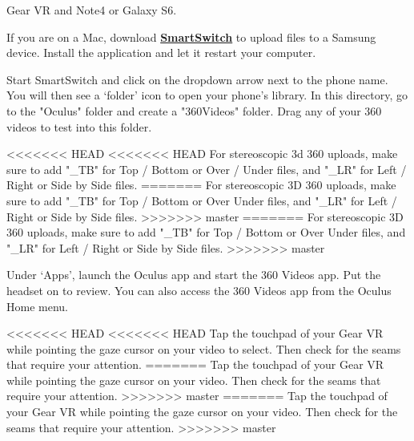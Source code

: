 \begin{fullwidth}
{\large Gear VR and Note4 or Galaxy S6. \par}

If you are on a Mac, download \textbf{\href{https://www.dropbox.com/sh/8kqte3wtyt3vltu/AAAjUnNxtXhaxprWF8_q9zbCa?dl=0}{SmartSwitch}} to upload files to a Samsung device. Install the application and let it restart your computer.

Start SmartSwitch and click on the dropdown arrow next to the phone name. You will then see a ‘folder’ icon to open your phone's library. In this directory, go to the "Oculus" folder and create a "360Videos" folder. Drag any of your 360 videos to test into this folder.

<<<<<<< HEAD
<<<<<<< HEAD
\tip For stereoscopic 3d 360 uploads, make sure to add "\_TB"  for Top / Bottom or Over / Under files, and "\_LR" for  Left / Right or Side by Side files.
=======
\tip For stereoscopic 3D 360 uploads, make sure to add "\_TB" for Top / Bottom or Over Under files, and "\_LR" for Left / Right or Side by Side files.
>>>>>>> master
=======
\tip For stereoscopic 3D 360 uploads, make sure to add "\_TB" for Top / Bottom or Over Under files, and "\_LR" for Left / Right or Side by Side files.
>>>>>>> master


\clearpage

Under ‘Apps’, launch the Oculus app and start the 360 Videos app. Put the headset on to review. You can also access the 360 Videos app from the Oculus Home menu.


<<<<<<< HEAD
<<<<<<< HEAD
Tap the touchpad of your Gear VR while pointing the gaze cursor on your video to select. Then check for the seams that require your attention.
=======
Tap the touchpad of your Gear VR while pointing the gaze cursor on your video. Then check for the seams that require your attention.
>>>>>>> master
=======
Tap the touchpad of your Gear VR while pointing the gaze cursor on your video. Then check for the seams that require your attention.
>>>>>>> master

\clearpage
\end{fullwidth}
